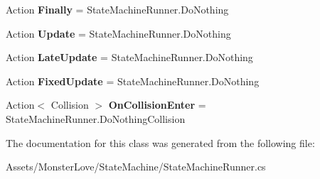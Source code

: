 \begin{DoxyCompactItemize}
\item 
Action {\bfseries Finally} = State\+Machine\+Runner.\+Do\+Nothing\hypertarget{class_monster_love_1_1_state_machine_1_1_state_mapping_a9d7682f2abed660782ee10232069426c}{}\label{class_monster_love_1_1_state_machine_1_1_state_mapping_a9d7682f2abed660782ee10232069426c}

\item 
Action {\bfseries Update} = State\+Machine\+Runner.\+Do\+Nothing\hypertarget{class_monster_love_1_1_state_machine_1_1_state_mapping_a951468e4062be10540d23f1fe1fae043}{}\label{class_monster_love_1_1_state_machine_1_1_state_mapping_a951468e4062be10540d23f1fe1fae043}

\item 
Action {\bfseries Late\+Update} = State\+Machine\+Runner.\+Do\+Nothing\hypertarget{class_monster_love_1_1_state_machine_1_1_state_mapping_a7d8a5c13b5123a9de6964f6511676d03}{}\label{class_monster_love_1_1_state_machine_1_1_state_mapping_a7d8a5c13b5123a9de6964f6511676d03}

\item 
Action {\bfseries Fixed\+Update} = State\+Machine\+Runner.\+Do\+Nothing\hypertarget{class_monster_love_1_1_state_machine_1_1_state_mapping_a9a148f7e399767c406041e9d75109a75}{}\label{class_monster_love_1_1_state_machine_1_1_state_mapping_a9a148f7e399767c406041e9d75109a75}

\item 
Action$<$ Collision $>$ {\bfseries On\+Collision\+Enter} = State\+Machine\+Runner.\+Do\+Nothing\+Collision\hypertarget{class_monster_love_1_1_state_machine_1_1_state_mapping_a78c2b4eff5e44db3e5b29741d946ef72}{}\label{class_monster_love_1_1_state_machine_1_1_state_mapping_a78c2b4eff5e44db3e5b29741d946ef72}

\end{DoxyCompactItemize}


The documentation for this class was generated from the following file\+:\begin{DoxyCompactItemize}
\item 
Assets/\+Monster\+Love/\+State\+Machine/State\+Machine\+Runner.\+cs\end{DoxyCompactItemize}
